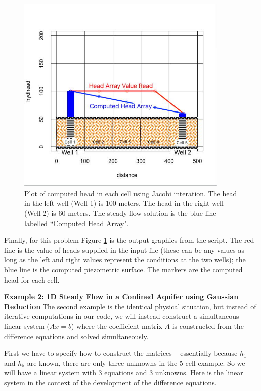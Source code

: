 \begin{figure}[h!] %
   \centering
   \includegraphics[width=4in]{./17-SteadyGroundwaterFlow/aquifer-1d-solution-case1.jpg} 
   \caption{Plot of computed head in each cell using Jacobi interation.   The head in the left well (Well 1) is 100 meters.   The head in the right well (Well 2) is 60 meters.  The steady flow solution is the blue line labelled ``Computed Head Array".}
   \label{fig:aquifer-1d-solution-case1}
\end{figure}
\newpage
Finally, for this problem Figure \ref{fig:aquifer-1d-solution-case1} is the output graphics from the script.  The red line is the value of heads supplied in the input file (these can be any values as long as the left and right values represent the conditions at the two wells); the blue line is the computed piezometric surface.  The markers are the computed head for each cell.

\textbf{Example 2: 1D Steady Flow in a Confined Aquifer using Gaussian Reduction}
The second example is the identical physical situation, but instead of iterative computations in our code, we will instead construct a simultaneous linear system ($Ax=b$) where the coefficient matrix $A$ is constructed from the difference equations and solved simultaneously.   

First we have to specify how to construct the matrices -- essentially because $h_1$ and $h_5$ are known, there are only three unknowns in the 5-cell example.  So we will have a linear system with 3 equations and 3 unknowns.  Here is the linear system in the context of the development of the difference equations.

